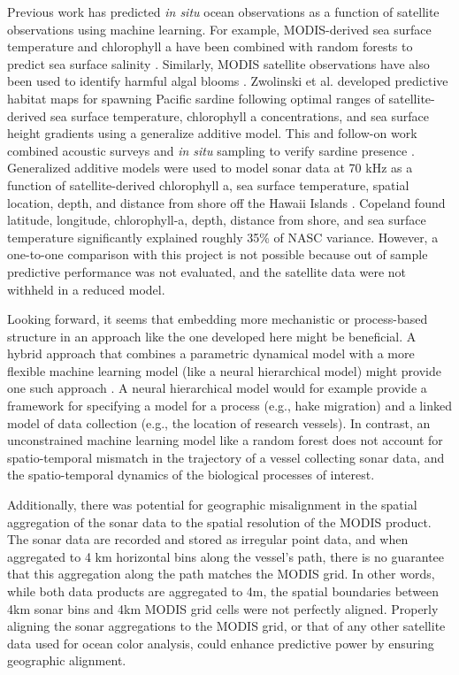 \documentclass[10pt,letterpaper]{article}
\begin{document}
Previous work has predicted \emph{in situ} ocean observations as a function of satellite observations using machine learning. 
For example, MODIS-derived sea surface temperature and chlorophyll a have been combined with random forests to predict sea surface salinity \cite{liu2015multivariable}.
Similarly, MODIS satellite observations have also been used to identify harmful algal blooms \cite{song2015learning}. 
Zwolinski et al. \cite{zwolinski2011predicting} developed predictive habitat maps for spawning Pacific sardine following optimal ranges of satellite-derived sea surface temperature, chlorophyll a concentrations, and sea surface height gradients using a generalize additive model. This and follow-on work combined acoustic surveys and \emph{in situ} sampling to verify sardine presence \cite{zwolinski2011predicting} \cite{demer2014corroboration}. 
Generalized additive models were used to model sonar data at 70 kHz as a function of satellite-derived chlorophyll a, sea surface temperature, spatial location, depth, and distance from shore off the Hawaii Islands \cite{copeland2016influences}. Copeland \cite{copeland2016influences} found latitude, longitude, chlorophyll-a, depth, distance from shore, and sea surface temperature significantly explained roughly 35\% of NASC variance. However, a one-to-one comparison with this project is not possible because out of sample predictive performance was not evaluated, and the satellite data were not withheld in a reduced model. 

Looking forward, it seems that embedding more mechanistic or process-based structure in an approach like the one developed here might be beneficial. 
A hybrid approach that combines a parametric dynamical model with a more flexible machine learning model (like a neural hierarchical model) might provide one such approach \cite{joseph2020}. 
A neural hierarchical model would for example provide a framework for specifying a model for a process (e.g., hake migration) and a linked model of data collection (e.g., the location of research vessels).
In contrast, an unconstrained machine learning model like a random forest does not account for spatio-temporal mismatch in the trajectory of a vessel collecting sonar data, and the spatio-temporal dynamics of the biological processes of interest.

Additionally, there was potential for geographic misalignment in the spatial aggregation of the sonar data to the spatial resolution of the MODIS product. 
The sonar data are recorded and stored as irregular point data, and when aggregated to 4 km horizontal bins along the vessel's path, there is no guarantee that this aggregation along the path matches the MODIS grid. 
In other words, while both data products are aggregated to 4m, the spatial boundaries between 4km sonar bins and 4km MODIS grid cells were not perfectly aligned.
Properly aligning the sonar aggregations to the MODIS grid, or that of any other satellite data used for ocean color analysis, could enhance predictive power by ensuring geographic alignment. 
\end{document}
